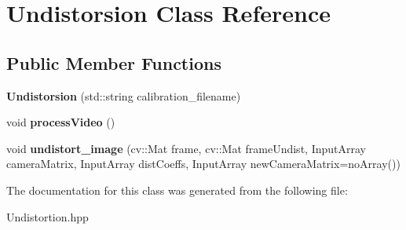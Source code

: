\hypertarget{class_undistorsion}{}\section{Undistorsion Class Reference}
\label{class_undistorsion}
\subsection*{Public Member Functions}
\begin{DoxyCompactItemize}
\item 
\mbox{\label{class_undistorsion_a447aceee5716c408a3ed662111525cf9}} 
{\bfseries Undistorsion} (std\+::string calibration\+\_\+filename)
\item 
\mbox{\label{class_undistorsion_ac398f8632efd4a268fc1a739db16c2d6}} 
void {\bfseries process\+Video} ()
\item 
\mbox{\label{class_undistorsion_a00c36a6d87702b119e87ca0ff003c92f}} 
void {\bfseries undistort\+\_\+image} (cv\+::\+Mat frame, cv\+::\+Mat frame\+Undist, Input\+Array camera\+Matrix, Input\+Array dist\+Coeffs, Input\+Array new\+Camera\+Matrix=no\+Array())
\end{DoxyCompactItemize}


The documentation for this class was generated from the following file\+:\begin{DoxyCompactItemize}
\item 
Undistortion.\+hpp\end{DoxyCompactItemize}
